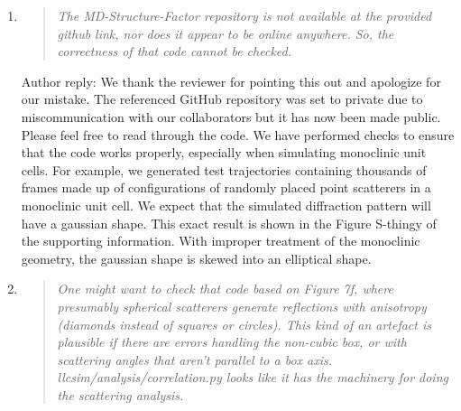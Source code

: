 \documentclass{article}
\begin{document}
\begin{enumerate}

    \item \begin{quote}
    \textit{The MD-Structure-Factor repository is not available at the provided
	    github link, nor does it appear to be online anywhere. So, the correctness of
	    that code cannot be checked.}
    \end{quote}
    
    Author reply: We thank the reviewer for pointing this out and apologize for
    our mistake. The referenced GitHub repository was set to private due to
    miscommunication with our collaborators but it has now been made public. Please
    feel free to read through the code. We have performed checks to ensure that the
    code works properly, especially when simulating monoclinic unit cells. For
    example, we generated test trajectories containing thousands of frames made up
    of configurations of randomly placed point scatterers in a monoclinic unit cell.
    We expect that the simulated diffraction pattern will have a gaussian shape.
    This exact result is shown in the Figure S-thingy of the supporting information.
    With improper treatment of the monoclinic geometry, the gaussian shape is
    skewed into an elliptical shape. 
    
    \item \begin{quote}
    \textit{One might want to check that code based on Figure 7f, where
	    presumably spherical scatterers generate reflections with anisotropy (diamonds
	    instead of squares or circles). This kind of an artefact is plausible if there
	    are errors handling the non-cubic box, or with scattering angles that aren't
	    parallel to a box axis. llcsim/analysis/correlation.py looks like it has the
	    machinery for doing the scattering analysis.}
    \end{quote}
	

\end{enumerate}
\end{document}
